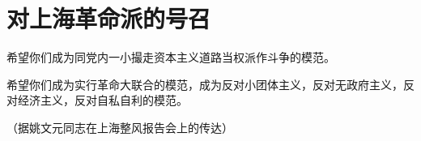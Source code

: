 \section[对上海革命派的号召（一九六七年五月）]{对上海革命派的号召}


希望你们成为同党内一小撮走资本主义道路当权派作斗争的模范。

希望你们成为实行革命大联合的模范，成为反对小团体主义，反对无政府主义，反对经济主义，反对自私自利的模范。

{\raggedleft （据姚文元同志在上海整风报告会上的传达）\par}



